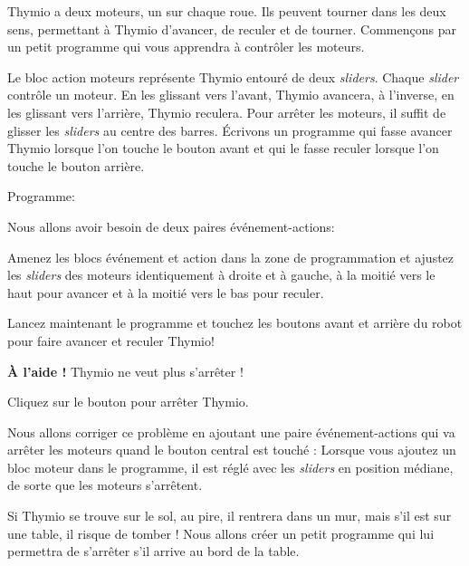 \label{ch.moving}


Thymio a deux moteurs, un sur chaque roue.
Ils peuvent tourner dans les deux sens, permettant à Thymio d'avancer, de reculer et de tourner. Commençons par un petit programme qui vous apprendra à contrôler les moteurs.

Le bloc action moteurs  représente Thymio entouré de deux \textit{sliders}.
Chaque \textit{slider} contrôle un moteur.
En les glissant vers l'avant, Thymio avancera, à l'inverse, en les glissant vers l'arrière, Thymio reculera.
Pour arrêter les moteurs, il suffit de glisser les \textit{sliders} au centre des barres.
Écrivons un programme qui fasse avancer Thymio lorsque l'on touche le bouton avant et qui le fasse reculer lorsque l'on touche le bouton arrière.

{\raggedleft \hfill Programme: }

Nous allons avoir besoin de deux paires événement-actions:

\begin{center}
\end{center}
Amenez les blocs événement et action dans la zone de programmation et ajustez les \textit{sliders} des moteurs identiquement à droite et à gauche, à la moitié vers le haut pour avancer et à la moitié vers le bas pour reculer.

Lancez maintenant le programme et touchez les boutons avant et arrière du robot pour faire avancer et reculer Thymio!


\textbf{À l'aide !} Thymio ne veut plus s'arrêter !

Cliquez sur le bouton   pour arrêter Thymio.

\newpage

Nous allons corriger ce problème en ajoutant une paire événement-actions qui va arrêter les moteurs quand le bouton central est touché : 
Lorsque vous ajoutez un bloc moteur dans le programme, il est réglé avec les \textit{sliders} en position médiane, de sorte que les moteurs s'arrêtent.


Si Thymio se trouve sur le sol, au pire, il rentrera dans un mur, mais s'il est sur une table, il risque de tomber !
Nous allons créer un petit programme qui lui permettra de s'arrêter s'il arrive au bord de la table.

